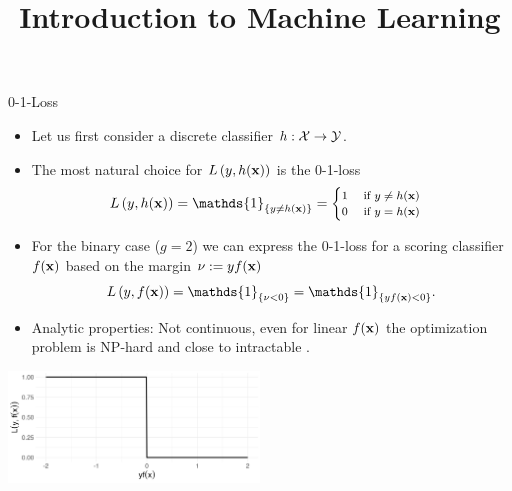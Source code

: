 \documentclass[11pt,compress,t,notes=noshow, xcolor=table]{beamer}
\title{Introduction to Machine Learning}
\begin{document}
    

\begin{vbframe}{0-1-Loss}

\begin{itemize}
  \item Let us first consider a discrete classifier $h: \mathcal{X} \to \mathcal{Y}$. 
  \item The most natural choice for $L\left(y, h(\mathbf{x})\right)$ is the 0-1-loss 
  \vspace*{-0.2cm}
  $$
  \Lhxy = \mathds{1}_{\{y \ne \hx\}} =
     \footnotesize \begin{cases} 1 \quad \text{ if } y \ne \hx \\ 0 \quad    \text{ if } y = \hx  \end{cases}
  $$
  \item For the binary case ($g = 2$) we can express the 0-1-loss for a scoring classifier $f(\mathbf{x})$ based on the margin $\nu := yf(\mathbf{x})$
  \vspace*{-0.2cm}
  $$
  \Lxy = \mathds{1}_{\{\nu < 0\}} = \mathds{1}_{\{y\fx < 0\}}. 
  $$
  \item Analytic properties:  Not continuous, even for linear $f(\mathbf{x})$ the optimization problem is NP-hard and close to intractable .
\end{itemize}

\begin{center}
\includegraphics[width = 0.5\textwidth]{figure/zero_one.png}
\end{center}

\end{vbframe}
\end{document}

